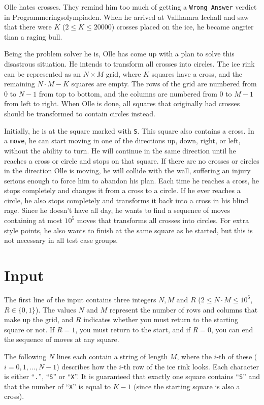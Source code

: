 \noindent
Olle hates crosses. They remind him too much of getting a \texttt{Wrong Answer} verdict in Programmeringsolympiaden.
When he arrived at Vallhamra Icehall and saw that there were $K$ ($2 \leq K \leq 20000$) crosses placed on the ice,
he became angrier than a raging bull.

Being the problem solver he is, Olle has come up with a plan to solve this disastrous situation. He intends to
transform all crosses into circles. The ice rink can be represented as an $N \times M$ grid, where $K$ squares
have a cross, and the remaining $N \cdot M - K$ squares are empty. The rows of the grid are numbered from $0$ to $N-1$
from top to bottom, and the columns are numbered from $0$ to $M-1$ from left to right. When Olle is done,
all squares that originally had crosses should be transformed to contain circles instead.

Initially, he is at the square marked with \texttt{S}. This square also contains a cross. In a \texttt{move}, he can
start moving in one of the directions up, down, right, or left, without the ability to turn. He will continue
in the same direction until he reaches a cross or circle and stops on that square. If there are no crosses or
circles in the direction Olle is moving, he will collide with the wall, suffering an injury serious enough to
force him to abandon his plan. Each time he reaches a cross, he stops completely and changes it from a cross to a circle.
If he ever reaches a circle, he also stops completely and transforms it back into a cross in his blind rage.
Since he doesn't have all day, he wants to find a sequence of moves containing at most \textbf{$10^5$} moves that
transforms all crosses into circles. For extra style points, he also wants to finish at the same square as he
started, but this is not necessary in all test case groups.

\section*{Input}
The first line of the input contains three integers $N, M$ and $R$ ($2 \le N \cdot M \leq 10^6$, $R \in \{0, 1\}$).
The values $N$ and $M$ represent the number of rows and columns that make up the grid, and $R$ indicates whether you must
return to the starting square or not. If $R = 1$, you must return to the start, and if $R = 0$, you can end the sequence
of moves at any square.

The following $N$ lines each contain a string of length $M$, where the $i$-th of these ($i = 0, 1, \dots, N-1$) describes
how the $i$-th row of the ice rink looks. Each character is either ``\texttt{.}'', ``\texttt{S}'' or ``\texttt{X}''.
It is guaranteed that exactly one square contains ``\texttt{S}'' and that the number of ``\texttt{X}'' is equal to
$K - 1$ (since the starting square is also a cross).

